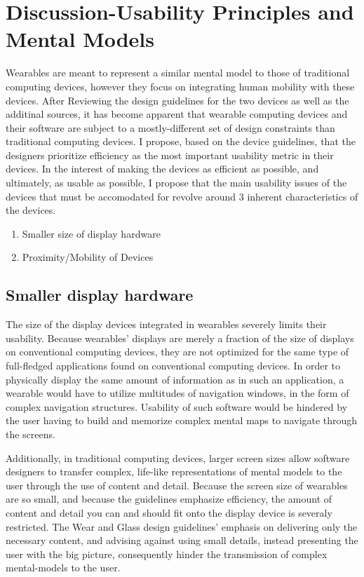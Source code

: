 \documentclass[12pt]{article}
\begin{document}
\section{Discussion-Usability Principles and Mental Models}
Wearables are meant to represent a similar mental model to those of traditional computing devices, however they focus on integrating human mobility with these devices. After Reviewing the design guidelines for the two devices as well as the additinal sources, it has become apparent that wearable computing devices and their software are subject to a mostly-different set of design constraints than traditional computing devices. I  propose, based on the device guidelines, that the designers prioritize efficiency as the most important usability metric in their devices. In the interest of making the devices as efficient as possible, and ultimately, as usable as possible, I propose that the main usability issues of the devices that must be accomodated for revolve around 3 inherent characteristics of the devices.

\begin{enumerate}
\item{Smaller size of display hardware}
\item{Proximity/Mobility of Devices}
\end{enumerate}

\subsection{Smaller display hardware}
The size of the display devices integrated in wearables severely limits their usability. Because wearables' displays are merely a fraction of the size of displays on conventional computing devices, they are not optimized for the same type of full-fledged applications found on conventional computing devices. In order to physically display the same amount of information as in such an application, a wearable would have to utilize multitudes of navigation windows, in the form of complex navigation structures. Usability of such software would be hindered by the user having to build and memorize complex mental maps to navigate through the screens.

Additionally, in traditional computing devices, larger screen sizes allow software designers to transfer complex, life-like representations of mental models to the user through the use of content and detail. Because the screen size of wearables are so small, and because the guidelines emphasize efficiency, the amount of content and detail you can and should fit onto the display device is severaly restricted. The Wear and Glass design guidelines' emphasis on delivering only the necessary content, and advising against using small details, instead presenting the user with the big picture, consequently hinder the transmission of complex mental-models to the user.
\end{document}
